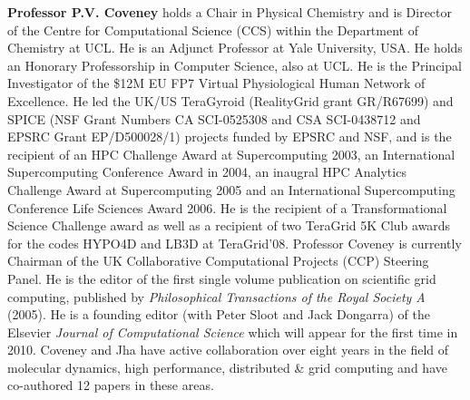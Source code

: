 
\textbf{Professor P.V. Coveney} holds a Chair in Physical Chemistry and is Director of the Centre for Computational Science (CCS) within the Department of Chemistry at UCL. He is an Adjunct Professor at Yale University, USA. He holds an Honorary Professorship in Computer Science, also at UCL. He is the Principal Investigator of the \$12M EU FP7 Virtual Physiological Human Network of Excellence. He led the UK/US TeraGyroid (RealityGrid grant GR/R67699) and SPICE (NSF Grant Numbers CA SCI-0525308 and CSA SCI-0438712 and EPSRC Grant EP/D500028/1) projects funded by EPSRC and NSF, and is the recipient of an HPC Challenge Award at Supercomputing 2003, an International Supercomputing Conference Award in 2004, an inaugral HPC Analytics Challenge Award at Supercomputing 2005 and an International Supercomputing Conference Life Sciences Award 2006. He is the recipient of a Transformational Science Challenge award as well as a recipient of two TeraGrid 5K Club awards for the codes HYPO4D and LB3D at TeraGrid'08. Professor Coveney is currently Chairman of the UK Collaborative Computational Projects (CCP) Steering Panel. He is the editor of the first single volume publication on scientific grid computing, published by \emph{Philosophical Transactions of the Royal Society A} (2005). He is a founding editor (with Peter Sloot and Jack Dongarra) of the Elsevier \emph{Journal of Computational Science} which will appear for the first time in 2010. Coveney and Jha have active collaboration over eight years in the field of molecular dynamics, high performance, distributed \& grid computing and have co-authored 12 papers in these areas.



